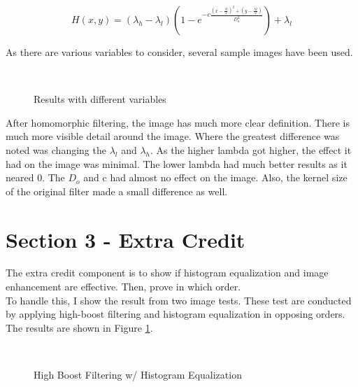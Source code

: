 \documentclass[10pt]{report}
\begin{document}
\begin{equation}
H(x,y) = \left ( \lambda_h - \lambda_l \right )\left (1 - e^{-c\frac{(x-\frac{N}{2})^2 +(y-\frac{M}{2})}{D_o^2}} \right )+\lambda_l
\label{eq:homomorphic}
\end{equation}

As there are various variables to consider, several sample images have been used.\\
\begin{figure}
\centering
{}
\\
\caption{Results with different variables}
\end{figure}

After homomorphic filtering, the image has much more clear definition. There is much more visible detail around the 
image. Where the greatest difference was noted was changing the $\lambda_l$ and $\lambda_h$. As the 
higher lambda got higher, the effect it had on the image was minimal. The lower lambda had much better results 
as it neared 0. The $D_o$ and c had almost no effect on the image. Also, the kernel size of the original filter
made a small difference as well.

\clearpage
\section*{Section 3 - Extra Credit}
The extra credit component is to show if histogram equalization and image enhancement are effective. Then, prove 
in which order.\\

To handle this, I show the result from two image tests. These test are conducted by 
applying high-boost filtering and histogram equalization in opposing orders. The results
are shown in Figure \ref{fig:ec}.\\

\begin{figure}[!h]
\centering
{}
\\
\caption{High Boost Filtering w/ Histogram Equalization}
\label{fig:ec}
\end{figure}
\end{document}
